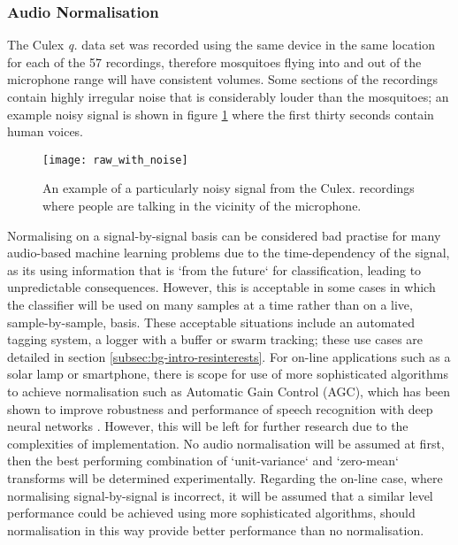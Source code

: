         \subsubsection{Audio Normalisation}
        \label{subsubsec:exp-clf-ass-aud}
            The Culex \textit{q.} data set was recorded using the same device in the same location for each of the 57 recordings, therefore mosquitoes flying into and out of the microphone range will have consistent volumes. Some sections of the recordings contain highly irregular noise that is considerably louder than the mosquitoes; an example noisy signal is shown in figure \ref{fig:exp-clf-audio-noisy} where the first thirty seconds contain human voices.
            \begin{figure}[ht]
                \centering
                \texttt{[image: raw\_with\_noise]}
                \caption{An example of a particularly noisy signal from the Culex. recordings where people are talking in the vicinity of the microphone.}
                \label{fig:exp-clf-audio-noisy}
            \end{figure}
            Normalising on a signal-by-signal basis can be considered bad practise for many audio-based machine learning problems due to the time-dependency of the signal, as its using information that is `from the future` for classification, leading to unpredictable consequences. However, this is acceptable in some cases in which the classifier will be used on many samples at a time rather than on a live, sample-by-sample, basis. These acceptable situations include an automated tagging system, a logger with a buffer or swarm tracking; these use cases are detailed in section \ref{subsec:bg-intro-resinterests}. For on-line applications such as a solar lamp or smartphone, there is scope for use of more sophisticated algorithms to achieve normalisation such as Automatic Gain Control (AGC), which has been shown to improve robustness and performance of speech recognition with deep neural networks \cite{Prabhavalkar2015}. However, this will be left for further research due to the complexities of implementation. No audio normalisation will be assumed at first, then the best performing combination of `unit-variance` and `zero-mean` transforms will be determined experimentally. Regarding the on-line case, where normalising signal-by-signal is incorrect, it will be assumed that a similar level performance could be achieved using more sophisticated algorithms, should normalisation in this way provide better performance than no normalisation.

